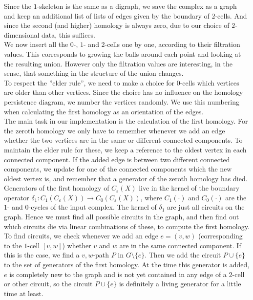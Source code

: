 \documentclass[11pt, a4paper, UKenglish]{article}
\begin{document}
    Since the $1$-skeleton is the same as a digraph, we save the complex as a graph and keep an additional list of lists of edges given by the boundary of $2$-cells.
    And since the second (and higher) homology is always zero, due to our choice of $2$-dimensional data, this suffices.\\
    We now insert all  the $0$-, $1$- and $2$-cells one by one, according to their filtration values.
    This corresponds to growing the balls around each point and looking at the resulting union.
    However only the filtration values are interesting, in the sense, that something in the structure of the union changes.\\
    To respect the ''elder rule'', we need to make a choice for $0$-cells which vertices are older than other vertices.
    Since the choice has no influence on the homology persistence diagram, we number the vertices randomly.
    We use this numbering when calculating the first homology as an orientation of the edges.\\
    The main task in our implementation is the calculation of the first homology.
    For the zeroth homology we only have to remember whenever we add an edge whether the two vertices are in the same or different connected components.
    To maintain the elder rule for these, we keep a reference to the oldest vertex in each connected component.
    If the added edge is between two different connected components, we update for one of the connected components which the new oldest vertex is, and remember that a generator of the zeroth homology has died.\\
    Generators of the first homology of $C_\varepsilon(X)$ live in the kernel of the boundary operator $\delta_1:C_1(C_\varepsilon(X))\rightarrow C_0(C_\varepsilon(X))$, where $C_1(\cdot)$ and $C_0(\cdot)$ are the $1$- and $0$-cycles of the input complex.
    The kernel of $\delta_1$ are just all circuits on the graph.
    Hence we must find all possible circuits in the graph, and then find out which circuits die via linear combinations of these, to compute the first homology.
    To find circuits, we check whenever we add an edge $e=(v,w)$ (corresponding to the $1$-cell $[v,w]$) whether $v$ and $w$ are in the same connected component.
    If this is the case, we find a $v,w$-path $P$ in $G\setminus \{e\}$.
    Then we add the circuit $P\cup \{e\}$ to the set of generators of the first homology.
    At the time this generator is added, $e$ is completely new to the graph and is not yet contained in any edge of a $2$-cell or other circuit, so the circuit $P\cup\{e\}$ is definitely a living generator for a little time at least.\\
\end{document}
